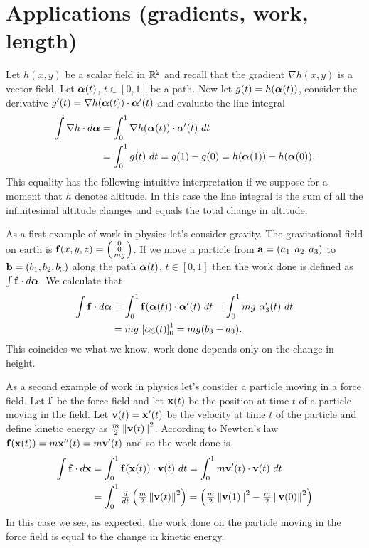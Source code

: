 \section{Applications (gradients, work, length)}

Let \(h(x,y)\) be a scalar field in \(\bR^2\)
and recall that the gradient \(\nabla h(x,y)\) is a vector field.
Let \(\aalpha(t)\), \(t\in [0,1]\) be a path.
Now let \(g(t) = h(\aalpha(t))\), consider the derivative
\(g'(t) = \nabla h(\aalpha(t))\cdot \aalpha'(t)\)
and evaluate the line integral
\[
    \begin{aligned}
        \int \nabla h \cdot d\aalpha
         & = \int_0^1 \nabla h(\aalpha(t)) \cdot \alpha'(t)\ dt \\
         & = \int_0^1 g(t) \ dt
        = g(1) - g(0)
        = h(\aalpha(1)) - h(\aalpha(0)).
    \end{aligned}
\]
This equality has the following intuitive interpretation if we suppose for a moment that \(h\) denotes altitude.
In this case the line integral is the sum of all the infinitesimal altitude changes and equals the total change in altitude.

As a first example of work in physics let's consider gravity.
The gravitational field on earth is \(\ff(x,y,z) = \left(\begin{smallmatrix}
        0 \\ 0 \\ mg
    \end{smallmatrix}\right)\).
If we move a particle from \(\aa=(a_1,a_2,a_3)\) to \(\bb=(b_1,b_2,b_3)\) along the path \(\aalpha(t)\), \(t\in [0,1]\)
then the work done is defined as \(\int \ff \cdot d\aalpha\).
We calculate that
\[
    \begin{aligned}
        \int \ff \cdot d\aalpha
         & = \int_0^1 \ff(\aalpha(t)) \cdot \aalpha'(t) \ dt
        = \int_0^1 mg \ \alpha_3'(t) \ dt                          \\
         & = mg \ {\left[ \alpha_3(t)\right]}_0^1 = mg(b_3 - a_3).
    \end{aligned}
\]
This coincides we what we know, work done depends only on the change in height.

As a second example of work in physics let's consider a particle moving in a force field.
Let \(\ff\) be the force field and let \(\xx(t)\) be the position at time \(t\) of a particle moving in the field.
Let \(\vv(t) = \xx'(t)\) be the velocity at time \(t\) of the particle and define kinetic energy as \(\frac{m}{2} \norm{\vv(t)}^2\).
According to Newton's law
\(\ff(\xx(t)) = m\xx''(t) = m \vv'(t)\)
and so the work done is
\[
    \begin{aligned}
        \int \ff \cdot d\xx
         & = \int_0^1 \ff(\xx(t)) \cdot \vv(t) \ dt
        = \int_0^1 m\vv'(t) \cdot \vv(t) \ dt                                   \\
         & = \int_0^1 \tfrac{d}{dt} \left( \tfrac{m}{2} \norm{\vv(t)}^2 \right)
        = \left(  \tfrac{m}{2} \norm{\vv(1)}^2  -  \tfrac{m}{2} \norm{\vv(0)}^2   \right)
    \end{aligned}
\]
In this case we see, as expected, the work done on the particle moving in the force field is equal to the change in kinetic energy.

